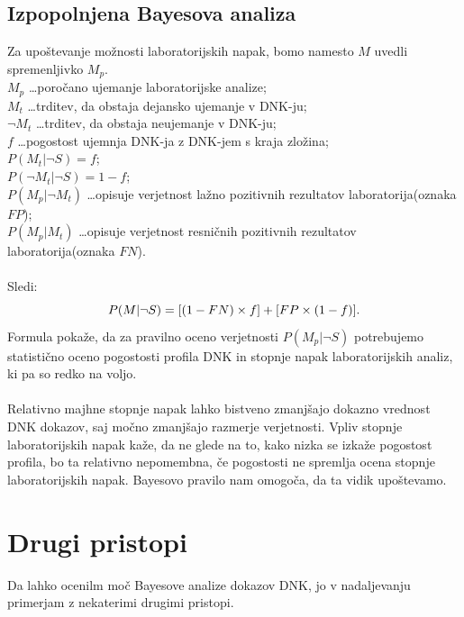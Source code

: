 \documentclass[12pt,a4paper]{amsart}
\theoremstyle{definition} %
\theoremstyle{plain} %
\begin{document}
\subsection{Izpopolnjena Bayesova analiza}
Za upoštevanje možnosti laboratorijskih napak, bomo namesto $M$ uvedli spremenljivko $M_p$.\\
$M_p$ \dots poročano ujemanje laboratorijske analize; \\
$M_t$ \dots trditev, da obstaja dejansko ujemanje v DNK-ju;\\
$\neg M_t$ \dots trditev, da obstaja neujemanje v DNK-ju;\\
$f$ \dots pogostost ujemnja DNK-ja z DNK-jem s kraja zložina;\\
$P(M_t \lvert \neg S) = f$; \\
$P(\neg M_t \lvert \neg S) = 1-f$;\\
$P(M_p \lvert \neg M_t)$ \dots opisuje verjetnost lažno pozitivnih rezultatov laboratorija(oznaka $FP$);\\
$P(M_p \lvert M_t)$ \dots opisuje verjetnost resničnih pozitivnih rezultatov laboratorija(oznaka $FN$).\\\\
Sledi:
\[
   P(M \lvert \neg S) = [(1 - FN) \times f] + [FP \times (1 - f)]. \vspace{2mm}
\]
Formula pokaže, da za pravilno oceno verjetnosti $P(M_p \lvert \neg S)$ potrebujemo statistično oceno pogostosti profila DNK in stopnje napak
laboratorijskih analiz, ki pa so redko na voljo.\\\\
Relativno majhne stopnje napak lahko bistveno zmanjšajo dokazno vrednost DNK dokazov, saj močno zmanjšajo razmerje verjetnosti. Vpliv stopnje 
laboratorijskih napak kaže, da ne glede na to, kako nizka se izkaže pogostost profila, bo ta relativno nepomembna, če pogostosti ne spremlja 
ocena stopnje laboratorijskih napak. Bayesovo pravilo nam omogoča, da ta vidik upoštevamo.

\section{Drugi pristopi}
Da lahko ocenilm moč Bayesove analize dokazov DNK, jo v nadaljevanju primerjam z nekaterimi drugimi pristopi.
\end{document}
